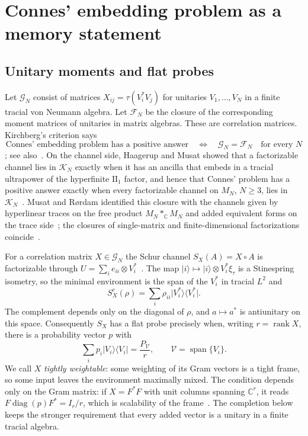 \documentclass[11pt]{article}
\theoremstyle{definition}
\theoremstyle{remark}
\DeclareMathOperator{\rank}{rank}
\newcommand{\K}{\mathcal K}
\newcommand{\G}{\mathcal G}
\newcommand{\Fm}{\mathcal F}
\newcommand{\C}{\mathbb C}
\newcommand{\ket}[1]{\lvert#1\rangle}
\newcommand{\bra}[1]{\langle#1\rvert}
\begin{document}
\section{Connes' embedding problem as a memory statement}\label{sec:connes}

\subsection{Unitary moments and flat probes}

Let $\G_N$ consist of matrices $X_{ij}=\tau(V_i^*V_j)$ for unitaries $V_1,\dots,V_N$ in a finite tracial von Neumann algebra. Let $\Fm_N$ be the closure of the corresponding moment matrices of unitaries in matrix algebras. These are correlation matrices. Kirchberg's criterion says
\begin{equation}\label{eq:kirchberg}
 \text{Connes' embedding problem has a positive answer}
 \quad\Longleftrightarrow\quad
 \G_N=\Fm_N\quad\text{for every }N
\end{equation}
\cite[Proposition~4.6]{Kirchberg}; see also~\cite[Section~1]{DJ}. On the channel side, Haagerup and Musat showed that a factorizable channel lies in $\K_N$ exactly when it has an ancilla that embeds in a tracial ultrapower of the hyperfinite $\mathrm{II}_1$ factor, and hence that Connes' problem has a positive answer exactly when every factorizable channel on $M_N$, $N\ge3$, lies in $\K_N$~\cite[Theorems~3.6 and~3.7]{HM2015}. Musat and R\o rdam identified this closure with the channels given by hyperlinear traces on the free product $M_N*_{\mathbb C}M_N$ and added equivalent forms on the trace side~\cite[Proposition~3.2(ii), Theorem~2.10 and Corollary~3.4]{MusatRordam21}; the closures of single-matrix and finite-dimensional factorizations coincide~\cite[Proposition~3.8(ii)]{Musat}.

For a correlation matrix $X\in\G_N$ the Schur channel $S_X(A)=X\circ A$ is factorizable through $U=\sum_ie_{ii}\otimes V_i^*$~\cite[Proposition~2.8]{HM2011}. The map $\ket i\mapsto\ket i\otimes V_i^*\xi_\tau$ is a Stinespring isometry, so the minimal environment is the span of the $V_i^*$ in tracial $L^2$ and
\[
 S_X^c(\rho)=\sum_i\rho_{ii}\ket{V_i^*}\bra{V_i^*}.
\]
The complement depends only on the diagonal of $\rho$, and $a\mapsto a^*$ is antiunitary on this space. Consequently $S_X$ has a flat probe precisely when, writing $r=\rank X$, there is a probability vector $p$ with
\begin{equation}\label{eq:tight}
 \sum_i p_i\ket{V_i}\bra{V_i}=\frac{P_{\mathcal V}}r,
 \qquad \mathcal V=\operatorname{span}\{V_i\}.
\end{equation}
We call $X$ \emph{tightly weightable}: some weighting of its Gram vectors is a tight frame, so some input leaves the environment maximally mixed. The condition depends only on the Gram matrix: if $X=F^*F$ with unit columns spanning $\C^r$, it reads $F\operatorname{diag}(p)F^*=I_r/r$, which is scalability of the frame~\cite{Scalable}. The completion below keeps the stronger requirement that every added vector is a unitary in a finite tracial algebra.
\end{document}
